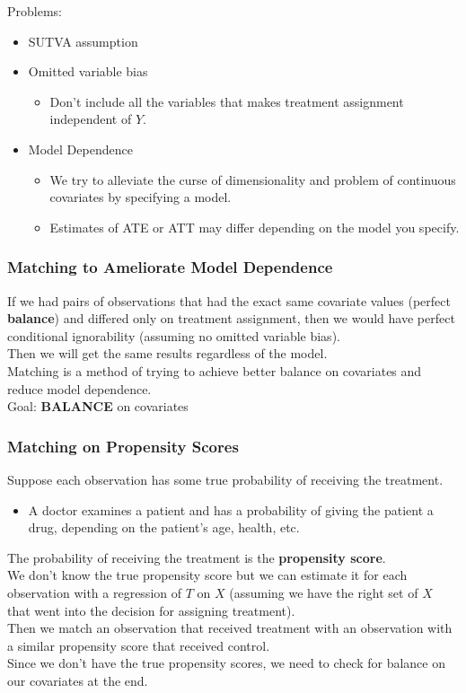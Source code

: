 \documentclass{beamer}
\begin{document}
\begin{frame}
Problems:
\pause
\bigskip
\begin{itemize}
\item SUTVA assumption
\pause
\bigskip
\item Omitted variable bias
\pause
\begin{itemize}
\item Don't include all the variables that makes treatment assignment independent of $Y$.
\end{itemize}
\pause
\bigskip
\item Model Dependence
\pause
\begin{itemize}
\item We try to alleviate the curse of dimensionality and problem of
continuous covariates by specifying a model.
\pause
\item Estimates of ATE or ATT may differ depending on the model you specify.
\end{itemize}
\end{itemize}
\end{frame}

\begin{frame}
\frametitle{Matching to Ameliorate Model Dependence}
\pause
If we had pairs of observations that had the exact same covariate
values (perfect {\bf balance}) and differed only on treatment assignment, then we would have
perfect conditional ignorability (assuming no omitted variable
bias).\\
\pause
\bigskip
Then we will get the same results regardless of the model.\\
\pause
\bigskip
Matching is a method of trying to achieve better balance on covariates
and reduce model dependence. \\
\pause
\bigskip
Goal: {\bf BALANCE} on covariates
\end{frame}

\begin{frame}
\frametitle{Matching on Propensity Scores}
\pause
Suppose each observation has some true probability of receiving the
treatment.
\pause
\begin{itemize}
\item A doctor examines a patient and has a probability of
giving the patient a drug, depending on the patient's age, health, etc.
\end{itemize}
\bigskip
\pause
The probability of receiving the treatment is the {\bf propensity
score}. \\
\pause
\bigskip
We don't know the true propensity score but we can estimate it for
each observation with a regression of $T$ on $X$ \pause (assuming we have the
right set of $X$ that went into the decision for assigning
treatment).\\
\pause
\bigskip
Then we match an observation that received treatment with an
observation with a similar propensity score that received control.\\
\pause
\bigskip
Since we don't have the true propensity scores, we need to check for
balance on our covariates at the end.
\end{frame}
\end{document}
